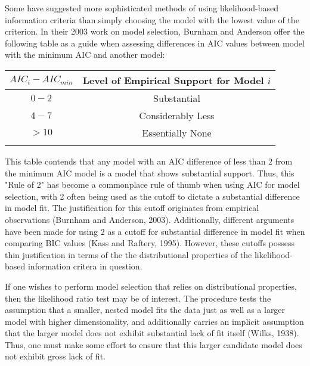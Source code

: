 		Some have suggested more sophisticated methods of using likelihood-based information criteria than simply choosing the model with the lowest value of the criterion. In their 2003 work on 
		model selection, Burnham and Anderson offer the following table as a guide when assessing differences in AIC values between model with the minimum AIC and another model:
		\pagebreak

		\begin{table}[h]
		\centering
		{
		\begin{tabular}{ c|c}
		$AIC_{i}-AIC_{min}$ & Level of Empirical Support for Model $i$\\
		 \hline
		 $0 - 2$ & Substantial\\
		 $4 - 7$ & Considerably Less\\
		 $> 10$ & Essentially None\\
		 \Xhline{3\arrayrulewidth}
		\end{tabular}
		}
		\end{table}	
		
		This table contends that any model with an AIC difference of less than $2$ from the minimum AIC model is a model that shows substantial support. Thus, this "Rule of 2" has become a
		commonplace rule of thumb when using AIC for model selection, with 2 often being used as the cutoff to dictate a substantial difference in model fit. The justification for this cutoff originates
		from empirical observations (Burnham and Anderson, 2003). Additionally, different  arguments have been made for using 2 as a cutoff for substantial difference in model fit
		when comparing BIC values (Kass and Raftery, 1995). However, these cutoffs possess thin justification in terms of the the distributional properties of the likelihood-based information
		critera in question.

		If one wishes to perform model selection that relies on distributional properties, then the likelihood ratio test may be of interest. The procedure tests the assumption that
		a smaller, nested model fits the data just as well as a larger model with higher dimensionality, and additionally carries an implicit assumption that the larger model does
		not exhibit substantial lack of fit itself (Wilks, 1938). Thus, one must make some effort to ensure that this larger candidate model does not exhibit gross lack of fit.

